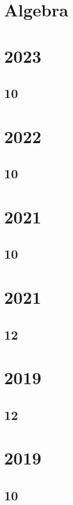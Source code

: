 
\iffalse

\section{Algebra}
\section{2023}
\subsection{10}

\section{2022}
\subsection{10}

\section{2021}
\subsection{10}



\section{2021}
\subsection{12}


\section{2019}
\subsection{12}



\section{2019} 
\subsection{10}

